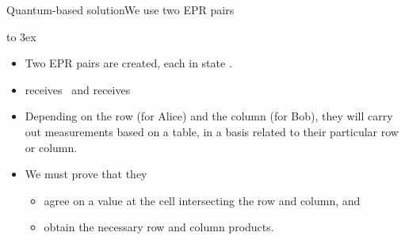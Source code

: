 \begin{frame}{Quantum-based solution}{We use two EPR pairs}

\Vskip{-4em}\begin{center}
%
\hbox to 3ex{\hss}%
\end{center}%

\begin{itemize}[<+->]
    \item Two EPR pairs are created, each in state .
    \item {} receives~ and  receives~
    \item Depending on the row (for Alice) and the column (for Bob), they will carry out measurements based on a table, in a basis related to their particular row or column.
    \item We must prove that they
    \begin{itemize}
        \item agree on a value at the cell intersecting the row and column, and
        \item obtain the necessary row and column products.
    \end{itemize}
\end{itemize}
    
\end{frame}

